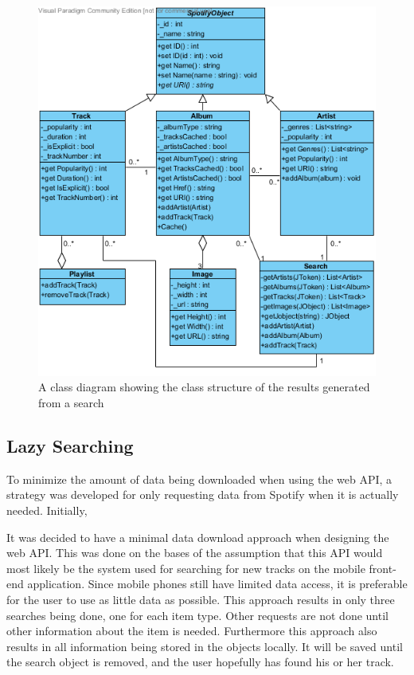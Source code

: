 \begin{figure}[H]
\centering
\includegraphics[width=\textwidth]{Images/WebAPIUML.png}
\caption{A class diagram showing the class structure of the results generated from a search}
\label{fig:WebAPIUML}
\end{figure}

\subsection{Lazy Searching}

To minimize the amount of data being downloaded when using the web API, a strategy was developed for only requesting data from Spotify when it is actually needed. Initially, 

It was decided to have a minimal data download approach when designing the web API. This was done on the bases of the assumption that this API would most likely be the system used for searching for new tracks on the mobile front-end application. Since mobile phones still have limited data access, it is preferable for the user to use as little data as possible. This approach results in only three searches being done, one for each item type. Other requests are not done until other information about the item is needed. Furthermore this approach also results in all information being stored in the objects locally. It will be saved until the search object is removed, and the user hopefully has found his or her track.

